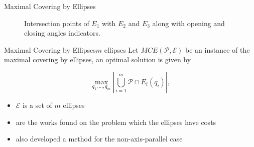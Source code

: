 \documentclass{beamer}
\newcommand{\Pp}{\mathscr{P}}
\newcommand{\E}{\mathscr{E}}
\begin{document}
\begin{frame}{Maximal Covering by Ellipses}
\begin{figure}[H]
	\centering
	
	\caption{Intersection points of $E_1$ with $E_2$ and $E_3$ along with opening and closing angles indicators.}
	
	\label{fig:3ellipses_with_gammas}
\end{figure}
\end{frame}

\begin{frame}{Maximal Covering by Ellipses}{$m$ ellipses}
	Let $MCE(\Pp, \E)$ be an instance of the maximal covering by ellipses, an optimal solution is given by
	
	\begin{equation*}
	\max_{q_1, \dots, q_m}{\left|\bigcup_{i=1}^{m} \Pp \cap E_i(q_i)\right|},
	\end{equation*}
	
	\begin{itemize}
		\item $\E$ is a set of $m$ ellipses
		\item \cite{andreta,canbolat} are the works found on the problem which the ellipses have costs
		\item \cite{andreta} also developed a method for the non-axis-parallel case
	\end{itemize}
\end{frame}
\end{document}

